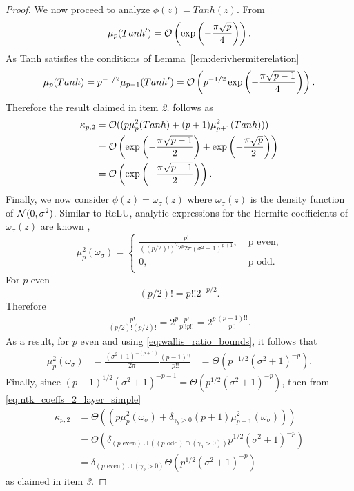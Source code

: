 \begin{proof}
    We now proceed to analyze $\phi(z) = Tanh(z)$. From \citet[Corollary F.7.1]{Panigrahi2020Effect}
    \[
    \mu_p(Tanh') = \mathcal{O} \left(\exp\left( - \frac{\pi \sqrt{p}}{4}\right)\right) . 
    \]
     As Tanh satisfies the conditions of Lemma~\ref{lem:derivhermiterelation}
    \[
    \mu_p(Tanh) = p^{-1/2} \mu_{p-1}(Tanh') = \mathcal{O} \left( p^{-1/2}\exp\left( - \frac{\pi \sqrt{p-1}}{4}\right)\right).
    \]
    Therefore the result claimed in item \emph{2.} follows as
    \[
    \begin{aligned}
    \kappa_{p,2}  &= \mathcal{O}((p\mu_p^2(Tanh) + (p+1)\mu_{p+1}^2(Tanh))) \\
    &= \mathcal{O} \left( \exp\left( - \frac{\pi \sqrt{p-1}}{2}\right) + \exp\left( - \frac{\pi \sqrt{p}}{2}\right) \right)\\
    &= \mathcal{O} \left( \exp\left( - \frac{\pi \sqrt{p-1}}{2}\right)\right).
    \end{aligned}
    \]
    Finally, we now consider $\phi(z) = \omega_{\sigma}(z)$ where $\omega_{\sigma}(z)$ is the density function of $\mathcal{N}(0, \sigma^2)$. Similar to ReLU, analytic expressions for the Hermite coefficients of $\omega_{\sigma}(z)$ are known \citep[see e.g.,][Theorem 2.9]{davis_hermite}, 
    \[
    \mu_p^2(\omega_{\sigma}) = 
    \begin{cases}
        \frac{p!}{(\left(p/2\right)!)^2 2^{p}2 \pi (\sigma^2 + 1)^{p+1}}, \; &\text{p even},\\
        0, \; &\text{p odd}.\\
    \end{cases}
    \]
    For $p$ even
    \[
        (p/2)! = p!! 2^{-p/2}.
    \]
    Therefore
    \[
    \begin{aligned}
        \frac{p!}{(p/2)!(p/2)!} = 2^p\frac{p!}{p!! p!!}
        = 2^p \frac{(p-1)!!}{p!!}.
    \end{aligned}
    \]
    As a result, for $p$ even and using \eqref{eq:wallis_ratio_bounds}, it follows that
    \[
    \begin{aligned}
        \mu_p^2(\omega_{\sigma}) &= \frac{(\sigma^2+1)^{-(p+1)}}{2 \pi } \frac{(p-1)!!}{p!!}
        & = \Theta(p^{-1/2}(\sigma^2+1)^{-p}) . 
    \end{aligned}
    \] 
    Finally, since $(p+1)^{1/2}(\sigma^2+1)^{-p-1} = \Theta(p^{1/2}(\sigma^2+1)^{-p})$, then from \eqref{eq:ntk_coeffs_2_layer_simple}  
    \[
    \begin{aligned}
        \kappa_{p,2}  &= \Theta(( p \mu_p^2(\omega_{\sigma}) + \delta_{\gamma_b>0}(p+1) \mu_{p+1}^2(\omega_{\sigma})))\\
        &= \Theta \left( \delta_{(p \text{ even}) \cup \left((p \text{ odd})\cap(\gamma_b>0)\right)}p^{1/2}(\sigma^2+1)^{-p}\right)\\
        & = \delta_{(p \text{ even}) \cup(\gamma_b>0)} \Theta \left( p^{1/2}(\sigma^2+1)^{-p}\right)
    \end{aligned}
    \]
    as claimed in item \emph{3.} 
\end{proof}




